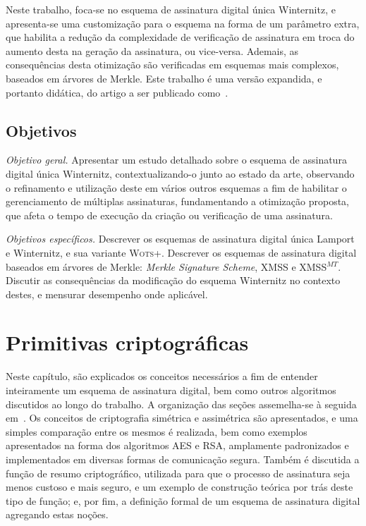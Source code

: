 \documentclass[12pt,notitlepage]{report}
\begin{document}
Neste trabalho, foca-se no esquema de assinatura digital única Winternitz, e
apresenta-se uma customização para o esquema na forma de um parâmetro extra,
que habilita a redução da complexidade de verificação de assinatura em troca
do aumento desta na geração da assinatura, ou vice-versa. Ademais, as
consequências desta otimização são verificadas em esquemas mais complexos,
baseados em árvores de Merkle. Este trabalho é uma versão expandida,
e portanto didática, do artigo a ser publicado como~\cite{Peri1806:Tuning}.

\section{Objetivos}

\emph{Objetivo geral.} Apresentar um estudo detalhado sobre o esquema de
assinatura digital única Winternitz, contextualizando-o junto ao estado da
arte, observando o refinamento e utilização deste em vários outros esquemas a
fim de habilitar o gerenciamento de múltiplas assinaturas, fundamentando a
otimização proposta, que afeta o tempo de execução da criação ou
verificação de uma assinatura.

\emph{Objetivos específicos.} Descrever os esquemas de assinatura digital única
Lamport e Winternitz, e sua variante \textsc{Wots+}. Descrever os esquemas de
assinatura digital baseados em árvores de Merkle: \emph{Merkle Signature
Scheme}, XMSS e XMSS$^{MT}$. Discutir as consequências da modificação
do esquema Winternitz no contexto destes, e mensurar desempenho onde aplicável.

\chapter{Primitivas criptográficas}

Neste capítulo, são explicados os conceitos necessários
a fim de entender inteiramente um esquema de assinatura digital, bem como outros
algoritmos discutidos ao longo do trabalho. A organização das seções assemelha-se
à seguida em~\cite{Gathen:2015:CRY:2857293}. Os conceitos de criptografia simétrica
e assimétrica são apresentados, e uma simples comparação entre os mesmos é realizada, 
bem como exemplos apresentados na forma dos algoritmos AES e RSA, amplamente
padronizados e implementados em diversas formas de comunicação segura. Também é
discutida a função de resumo criptográfico, utilizada para que o processo de assinatura
seja menos custoso e mais seguro, e um exemplo de construção teórica por trás
deste tipo de função; e, por fim, a definição formal de um esquema de assinatura
digital agregando estas noções.
\end{document}
